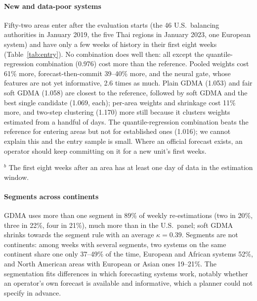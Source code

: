 \paragraph{New and data-poor systems}
Fifty-two areas enter after the evaluation starts (the 46 U.S.\ balancing authorities in January 2019, the five Thai regions in January 2023, one European system) and have only a few weeks of history in their first eight weeks (Table~\ref{tab:entry}).
No combination does well then: all except the quantile-regression combination (0.976) cost more than the reference.
Pooled weights cost 61\% more, forecast-then-commit 39--40\% more, and the neural gate, whose features are not yet informative, 2.6 times as much.
Plain GDMA (1.053) and fair soft GDMA (1.058) are closest to the reference, followed by soft GDMA and the best single candidate (1.069, each); per-area weights and shrinkage cost 11\% more, and two-step clustering (1.170) more still because it clusters weights estimated from a handful of days.
The quantile-regression combination beats the reference for entering areas but not for established ones (1.016); we cannot explain this and the entry sample is small.
Where an official forecast exists, an operator should keep committing on it for a new unit's first weeks.

\begin{table}[t]
\centering
\caption{Commitment cost of areas entering the panel, relative to the reference forecaster ($W=28$, eleven candidates). Lower is better: values below 1 mean a lower cost than the benchmark.}\label{tab:entry}
\footnotesize

\par\smallskip\footnotesize $^b$ The first eight weeks after an area has at least one day of data in the estimation window.
\end{table}

\paragraph{Segments across continents}
GDMA uses more than one segment in 89\% of weekly re-estimations (two in 20\%, three in 22\%, four in 21\%), much more than in the U.S.\ panel; soft GDMA shrinks towards the segment rule with an average $\kappa=0.39$.
Segments are not continents: among weeks with several segments, two systems on the same continent share one only 37--49\% of the time, European and African systems 52\%, and North American areas with European or Asian ones 19--21\%.
The segmentation fits differences in which forecasting systems work, notably whether an operator's own forecast is available and informative, which a planner could not specify in advance.

